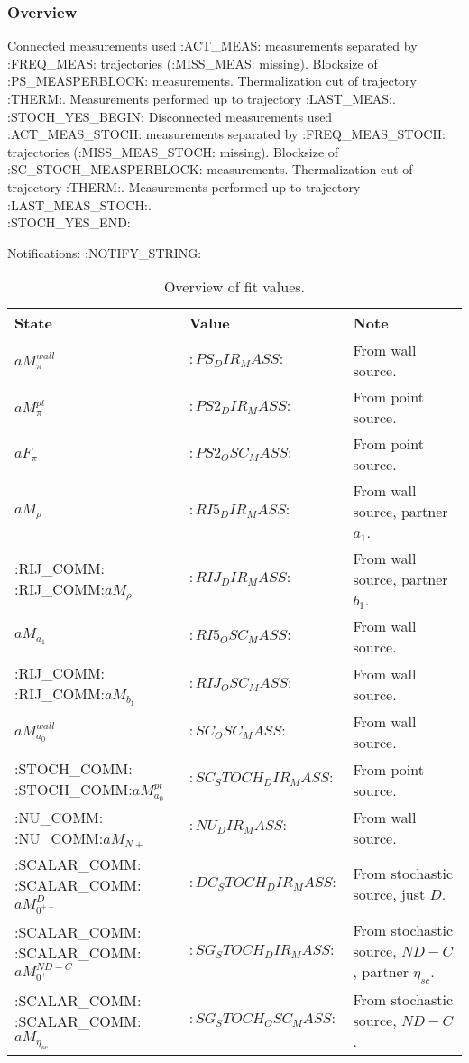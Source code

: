 

\subsubsection{Overview}

Connected measurements used :ACT_MEAS: measurements separated by :FREQ_MEAS: trajectories (:MISS_MEAS: missing). Blocksize of :PS_MEASPERBLOCK: measurements. Thermalization cut of trajectory :THERM:. Measurements performed up to trajectory :LAST_MEAS:. 
~\\

:STOCH_YES_BEGIN:
\noindent Disconnected measurements used :ACT_MEAS_STOCH: measurements separated by :FREQ_MEAS_STOCH: trajectories (:MISS_MEAS_STOCH: missing). Blocksize of :SC_STOCH_MEASPERBLOCK: measurements. Thermalization cut of trajectory :THERM:. Measurements performed up to trajectory :LAST_MEAS_STOCH:.
~\\
:STOCH_YES_END:

\noindent Notifications: :NOTIFY_STRING:

\begin{table}[ht!]
\centering
\begin{tabular}{|l|l|l|}
\hline
 State & Value & Note \\
\hline
 $aM_\pi^{wall}$ & $:PS_DIR_MASS:$ & From wall source. \\
\hline
 $aM_\pi^{pt}$ & $:PS2_DIR_MASS:$ & From point source. \\
\hline
 $aF_\pi$ & $:PS2_OSC_MASS:$ & From point source. \\
\hline
 $aM_{\rho}$ & $:RI5_DIR_MASS:$ & From wall source, partner $a_1$. \\
:RIJ_COMM:\hline
 :RIJ_COMM:$aM_{\rho}$ & $:RIJ_DIR_MASS:$ & From wall source, partner $b_1$.\\
\hline
 $aM_{a_1}$ & $:RI5_OSC_MASS:$ & From wall source. \\
:RIJ_COMM:\hline
 :RIJ_COMM:$aM_{b_1}$ & $:RIJ_OSC_MASS:$ & From wall source.\\
\hline
 $aM_{a_0}^{wall}$ & $:SC_OSC_MASS:$ & From wall source. \\
:STOCH_COMM:\hline
 :STOCH_COMM:$aM_{a_0}^{pt}$ & $:SC_STOCH_DIR_MASS:$ & From point source. \\
:NU_COMM:\hline
 :NU_COMM:$aM_{N+}$ & $:NU_DIR_MASS:$ & From wall source. \\
:SCALAR_COMM:\hline
 :SCALAR_COMM:$aM_{0^{++}}^{D}$ & $:DC_STOCH_DIR_MASS:$ & From stochastic source, just $D$. \\
:SCALAR_COMM:\hline
 :SCALAR_COMM:$aM_{0^{++}}^{ND-C}$ & $:SG_STOCH_DIR_MASS:$ & From stochastic source, $ND-C$, partner $\eta_{sc}$. \\
:SCALAR_COMM:\hline
 :SCALAR_COMM:$aM_{\eta_{sc}}$ & $:SG_STOCH_OSC_MASS:$ & From stochastic source, $ND-C$. \\
\hline
\end{tabular}
\caption{Overview of fit values.}
\end{table}

